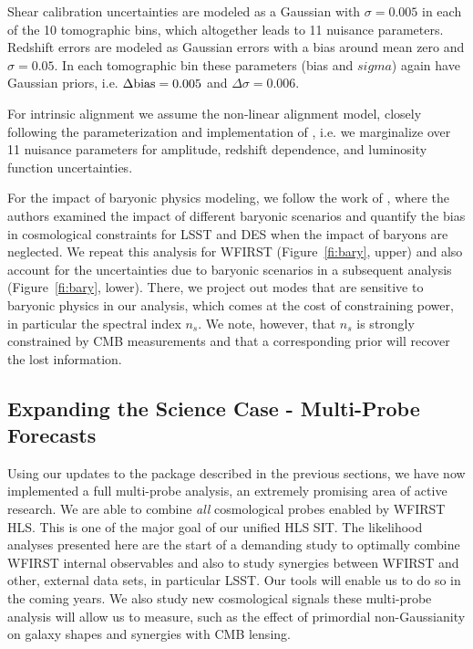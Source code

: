 Shear calibration uncertainties are modeled as a Gaussian with $\sigma=0.005$ in each of the 10 tomographic bins, which altogether leads to 11 nuisance parameters. Redshift errors are modeled as Gaussian errors with a bias around mean zero and $\sigma=0.05$. In each tomographic bin these parameters (bias and $sigma$) again have Gaussian priors, i.e. $\Delta \mathrm{bias}=0.005$ and $\Delta \sigma=0.006$.

For intrinsic alignment we assume the non-linear alignment model, closely following the parameterization and implementation of \cite{Krause2016}, i.e. we marginalize over 11 nuisance parameters for amplitude, redshift dependence, and luminosity function uncertainties.

For the impact of baryonic physics modeling, we follow the work of \cite{Eifler2015}, where the authors
examined the impact of different baryonic scenarios and quantify the bias in
cosmological constraints for LSST and DES when the impact of baryons are neglected. We repeat this analysis for WFIRST (Figure~\ref{fi:bary}, upper) and
also account for the uncertainties due to baryonic scenarios in a subsequent
analysis (Figure~\ref{fi:bary}, lower). There, we project out modes that are
sensitive to baryonic physics in our analysis, which comes at the cost of
constraining power, in particular the spectral index $n_s$. We note, however, that
$n_s$ is strongly constrained by CMB measurements and that a corresponding prior
will recover the lost information.


\subsection{Expanding the Science Case - Multi-Probe Forecasts}
\label{sec:multi-probe}

\begin{summaryii}
Using our updates to the \CoLi package described in the previous sections, we have now implemented a full multi-probe analysis, an extremely promising area of active research. We are able to combine \emph{all} cosmological probes enabled by WFIRST HLS. This is one of the major goal of our unified HLS SIT. The likelihood analyses presented here are the start of a demanding study to optimally combine WFIRST internal observables and also to study synergies between WFIRST and other, external data sets, in particular LSST\@. Our tools will enable us to do so in the coming years. We also study new cosmological signals these multi-probe analysis will allow us to measure, such as the effect of primordial non-Gaussianity on galaxy shapes and synergies with CMB lensing.
\end{summaryii}


